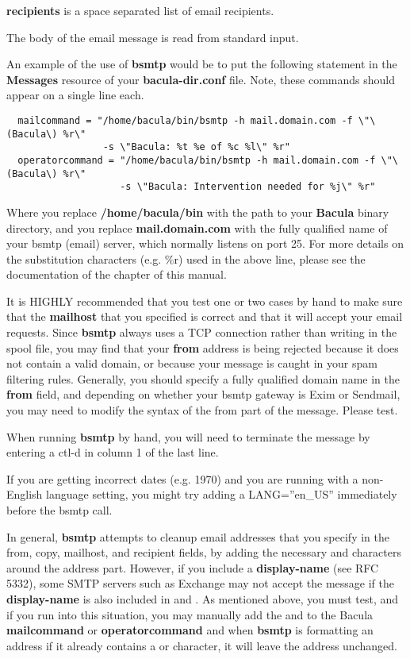{\bf recipients} is a space separated list of email recipients. 

The body of the email message is read from standard input. 

An example of the use of {\bf bsmtp} would be to put the following statement
in the {\bf Messages} resource of your {\bf bacula-dir.conf} file. Note, these
commands should appear on a single line each. 

\footnotesize
\begin{verbatim}
  mailcommand = "/home/bacula/bin/bsmtp -h mail.domain.com -f \"\(Bacula\) %r\"
                 -s \"Bacula: %t %e of %c %l\" %r"
  operatorcommand = "/home/bacula/bin/bsmtp -h mail.domain.com -f \"\(Bacula\) %r\"
                    -s \"Bacula: Intervention needed for %j\" %r"
\end{verbatim}
\normalsize

Where you replace {\bf /home/bacula/bin} with the path to your {\bf Bacula}
binary directory, and you replace {\bf mail.domain.com} with the fully
qualified name of your bsmtp (email) server, which normally listens on port
25. For more details on the substitution characters (e.g. \%r) used in the
above line, please see the documentation of the 
chapter of this manual. 

It is HIGHLY recommended that you test one or two cases by hand to make sure
that the {\bf mailhost} that you specified is correct and that it will accept
your email requests. Since {\bf bsmtp} always uses a TCP connection rather
than writing in the spool file, you may find that your {\bf from} address is
being rejected because it does not contain a valid domain, or because your
message is caught in your spam filtering rules. Generally, you should specify
a fully qualified domain name in the {\bf from} field, and depending on
whether your bsmtp gateway is Exim or Sendmail, you may need to modify the
syntax of the from part of the message. Please test. 

When running {\bf bsmtp} by hand, you will need to terminate the message by
entering a ctl-d in column 1 of the last line. 

If you are getting incorrect dates (e.g. 1970) and you are
running with a non-English language setting, you might try adding
a LANG=''en\_US'' immediately before the bsmtp call.

In general, {\bf bsmtp} attempts to cleanup email addresses that you
specify in the from, copy, mailhost, and recipient fields, by adding
the necessary \lt{} and \gt{} characters around the address part.  However,
if you include a {\bf display-name} (see RFC 5332), some SMTP servers
such as Exchange may not accept the message if the {\bf display-name} is
also included in \lt{} and \gt{}.  As mentioned above, you must test, and
if you run into this situation, you may manually add the \lt{} and \gt{}
to the Bacula {\bf mailcommand} or {\bf operatorcommand} and when
{\bf bsmtp} is formatting an address if it already contains a \lt{} or
\gt{} character, it will leave the address unchanged.

